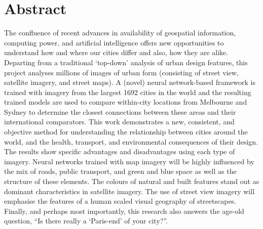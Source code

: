 \documentclass[10pt,letterpaper,hidelinks]{article}
\begin{document}
\section*{Abstract}
The confluence of recent advances in availability of geospatial information, computing power, and artificial intelligence offers new opportunities to understand how and where our cities differ and also, how they are alike. Departing from a traditional `top-down' analysis of urban design features, this project analyses millions of images of urban form (consisting of street view, satellite imagery, and street maps). A (novel) neural network-based framework is trained with imagery from the largest 1692 cities in the world and the resulting trained models are used to compare within-city locations from Melbourne and Sydney to determine the closest connections between these areas and their international comparators. This work demonstrates a new, consistent, and objective method for understanding the relationship between cities around the world, and the health, transport, and environmental consequences of their design. The results show specific advantages and disadvantages using each type of imagery. Neural networks trained with map imagery will be highly influenced by the mix of roads, public transport, and green and blue space as well as the structure of these elements. The colours of natural and built features stand out as dominant characteristics in satellite imagery. The use of street view imagery will emphasise the features of a human scaled visual geography of streetscapes. Finally, and perhaps most importantly, this research also answers the age-old question, ``Is there really a `Paris-end' of your city?''.

\end{document}
